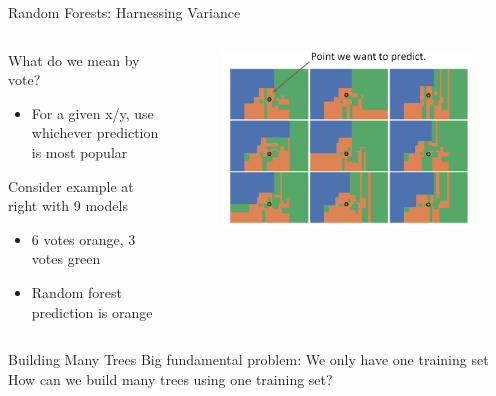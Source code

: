 \documentclass[aspectratio=169]{../latex_main/tntbeamer}  %
\begin{document}
	
	\begin{frame}{Random Forests: Harnessing Variance}
	    \begin{columns}
	        \begin{column}{.5\textwidth}
	                What do we mean by vote?
	                \begin{itemize}
	                    \item For a given x/y, use whichever prediction is most popular
	                \end{itemize}
	                
	                Consider example at right with 9 models
	                \begin{itemize}
	                    \item 6 votes orange, 3 votes green 
	                    \item Random forest prediction is orange
	                \end{itemize}
	        \end{column}
	        
	        \begin{column}{.5\textwidth}
	                \begin{figure}
	                    \centering
	                    \includegraphics[scale=.35]{Bild56}
	                \end{figure}
	        \end{column}
	    \end{columns}
	\end{frame}
	
	\begin{frame}{Building Many Trees}
	    Big fundamental problem: We only have one training set\\
	    \bigskip
	    How can we build many trees using one training set?

	\end{frame}
	
\end{document}
